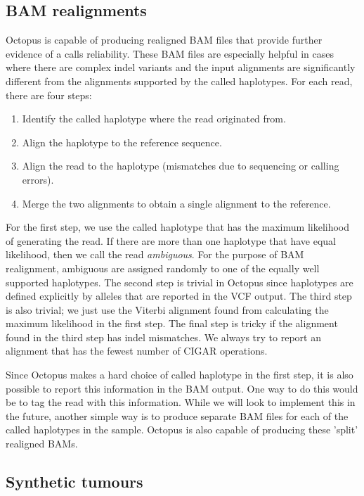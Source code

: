 \documentclass[notitlepage, twocolumn]{article}
\begin{document}
\subsection*{BAM realignments}

Octopus is capable of producing realigned BAM files that provide further evidence of a calls reliability. These BAM files are especially helpful in cases where there are complex indel variants and the input alignments are significantly different from the alignments supported by the called haplotypes. For each read, there are four steps:

\begin{enumerate}
	\item Identify the called haplotype where the read originated from.
	\item Align the haplotype to the reference sequence.
	\item Align the read to the haplotype (mismatches due to sequencing or calling errors).
	\item Merge the two alignments to obtain a single alignment to the reference.
\end{enumerate}

For the first step, we use the called haplotype that has the maximum likelihood of generating the read. If there are more than one haplotype that have equal likelihood, then we call the read \emph{ambiguous}. For the purpose of BAM realignment, ambiguous are assigned randomly to one of the equally well supported haplotypes. The second step is trivial in Octopus since haplotypes are defined explicitly by alleles that are reported in the VCF output. The third step is also trivial; we just use the Viterbi alignment found from calculating the maximum likelihood in the first step. The final step is tricky if the alignment found in the third step has indel mismatches. We always try to report an alignment that has the fewest number of CIGAR operations.

Since Octopus makes a hard choice of called haplotype in the first step, it is also possible to report this information in the BAM output. One way to do this would be to tag the read with this information. While we will look to implement this in the future, another simple way is to produce separate BAM files for each of the called haplotypes in the sample. Octopus is also capable of producing these 'split' realigned BAMs.

\subsection*{Synthetic tumours}
\end{document}
